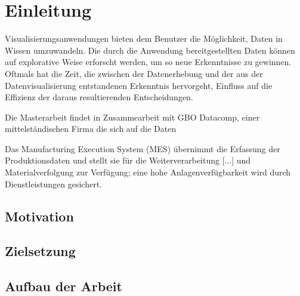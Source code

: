 \chapter{Einleitung}
\label{chap:einleitung}
Visualisierungsanwendungen bieten dem Benutzer die Möglichkeit,
Daten in Wissen umzuwandeln. Die durch die Anwendung bereitgestellten
Daten können auf explorative Weise erforscht werden, um so neue
Erkenntnisse zu gewinnen. Oftmals hat die Zeit, die zwischen der 
Datenerhebung und der aus der Datenvisualisierung entstandenen Erkenntnis
hervorgeht, Einfluss auf die Effizienz der daraus resultierenden Entscheidungen.

Die Masterarbeit findet in Zusammearbeit mit GBO Datacomp, einer mittelständischen Firma
die sich auf die Daten

Das Manufacturing Execution System (MES) übernimmt
die Erfassung der Produktionsdaten und stellt
sie für die Weiterverarbeitung [...] und Materialverfolgung
zur Verfügung; eine hohe Anlagenverfügbarkeit wird
durch Dienstleistungen gesichert. 

\section{Motivation}
\label{sec:motivation}


\section{Zielsetzung}
\label{sec:zielsetzung}

\section{Aufbau der Arbeit}
\label{sec:aufbauderarbeit}




